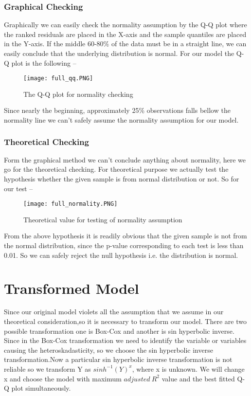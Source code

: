 \documentclass[A4paper,11pt]{report}
\begin{document}
	 \subsubsection{Graphical Checking}
	 Graphically we can easily check the normality assumption by the Q-Q plot where the ranked residuals are placed in the X-axis and the sample quantiles are placed in the Y-axis. If the middle 60-80\% of the data must be in a straight line, we can easily conclude that the underlying distribution is normal. For our model the Q-Q plot is the following --
	 \begin{figure}[H]
	 	\texttt{[image: full\_qq.PNG]}
	 	\caption{The Q-Q plot for normality checking}
	 \end{figure}
	 Since nearly the beginning, approximately 25\% observations falls bellow the normality line we can't safely assume the normality assumption for our model. 
	 \subsubsection{Theoretical Checking}
	 Form the graphical method we can't conclude anything about normality, here we go for the theoretical checking. For theoretical purpose we actually test the hypothesis whether the given sample is from normal distribution or not. So for our test --
	 \begin{figure}[H]
	 	\texttt{[image: full\_normality.PNG]}
	 	\caption{Theoretical value for testing of normality assumption}
	 \end{figure}
	 From the above hypothesis it is readily obvious that the given sample is not from the normal distribution, since the p-value corresponding to each test is less than 0.01. So we can safely reject the null hypothesis i.e. the distribution is normal. 
	 \section{Transformed Model}
	 Since our original model violets all the assumption that we assume in our theoretical consideration,so it is necessary to transform our model. There are two possible transformation one is Box-Cox and another is sin hyperbolic inverse. Since in the Box-Cox transformation we need to identify the variable or variables causing the heteroskadasticity, so we choose the sin hyperbolic inverse transformation.Now a particular sin hyperbolic inverse transformation is not reliable so we transform Y as $sinh^{-1}(Y)^x$, where x is unknown. We will change x and choose the model with maximum $adjusted\ R^2$ value and the best fitted Q-Q plot simultaneously.
\end{document}

